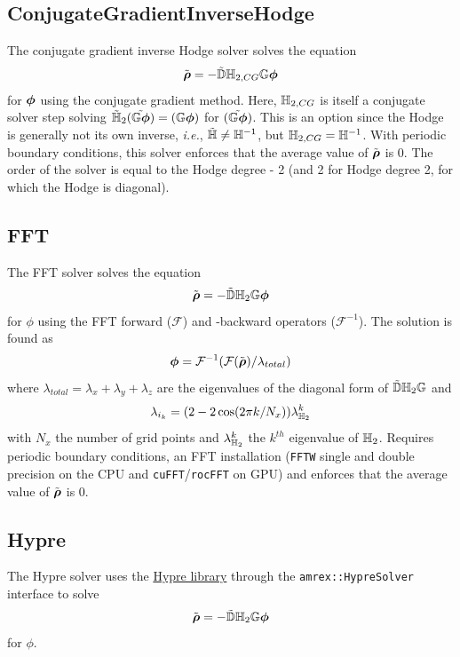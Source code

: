 \documentclass[11pt]{article}
\begin{document}
\subsection{ConjugateGradientInverseHodge}
The conjugate gradient inverse Hodge solver solves the equation 
\begin{equation}
    {\tilde{\boldsymbol{\rm \mathsf{\rho}}}}=-\tilde{\mathbb{D}}\mathbb{H}_{2,CG}\mathbb{G}{\boldsymbol {\rm \mathsf{\phi}}}
\end{equation}
for ${\boldsymbol {\rm \mathsf{\phi}}}$ using the conjugate gradient method.
Here, $\mathbb{H}_{2,CG}$ is itself a conjugate solver step solving $\tilde{\mathbb{H}}_2(\tilde{\mathbb{G}{\boldsymbol {\rm \mathsf{\phi}}}})=(\mathbb{G}{\boldsymbol {\rm \mathsf{\phi}}})$ for $(\tilde{\mathbb{G}{\boldsymbol {\rm \mathsf{\phi}}}})$.
This is an option since the Hodge is generally not its own inverse, \emph{i.e.}, $\tilde{\mathbb{H}}\neq\mathbb{H}^{-1}$, but $\mathbb{H}_{2,CG}=\mathbb{H}^{-1}$.
With periodic boundary conditions, this solver enforces that the average value of ${\tilde{\boldsymbol {\rm \mathsf{\rho}}}}$ is $0$. The order of the solver is equal to the Hodge degree - 2 (and 2 for Hodge degree 2, for which the Hodge is diagonal).

\subsection{FFT}
The FFT solver solves the equation 
\begin{equation}
    {\tilde{\boldsymbol{\rm \mathsf{\rho}}}}=-\tilde{\mathbb{D}}\mathbb{H}_2\mathbb{G}{\boldsymbol {\rm \mathsf{\phi}}}
\end{equation}
for $\phi$ using the FFT forward ($\mathcal{F}$) and -backward operators ($\mathcal{F}^{-1}$).
The solution is found as
\begin{equation}
    {\boldsymbol{\rm \mathsf{\phi}}} = \mathcal{F}^{-1}(\mathcal{F}({\tilde{\boldsymbol {\rm \mathsf{\rho}}}})/\lambda_{total})
\end{equation}
where $\lambda_{total} = \lambda_x + \lambda_y + \lambda_z$ are the eigenvalues of the diagonal form of $\tilde{\mathbb{D}}\mathbb{H}_2\mathbb{G}$ and
\begin{equation}
    \lambda_{i_k} = (2-2\cos(2\pi k/N_x))\lambda^k_{\mathbb{H}_2}
\end{equation}
with $N_x$ the number of grid points and $\lambda^k_{\mathbb{H}_2}$ the $k^{th}$ eigenvalue of $\mathbb{H}_2$.
Requires periodic boundary conditions, an FFT installation (\verb|FFTW| single and double precision on the CPU and \verb|cuFFT|/\verb|rocFFT| on GPU) and enforces that the average value of ${\tilde{\boldsymbol {\rm \mathsf{\rho}}}}$ is $0$. 

\subsection{Hypre}
The Hypre solver uses the \href{https://computing.llnl.gov/projects/hypre-scalable-linear-solvers-multigrid-methods}{Hypre library} through the \lstinline{amrex::HypreSolver}
interface to solve
\begin{equation}
    {\tilde{\boldsymbol{\rm \mathsf{\rho}}}}=-\tilde{\mathbb{D}}\mathbb{H}_2\mathbb{G}{\boldsymbol {\rm \mathsf{\phi}}}
\end{equation}
for $\phi$.
\end{document}
